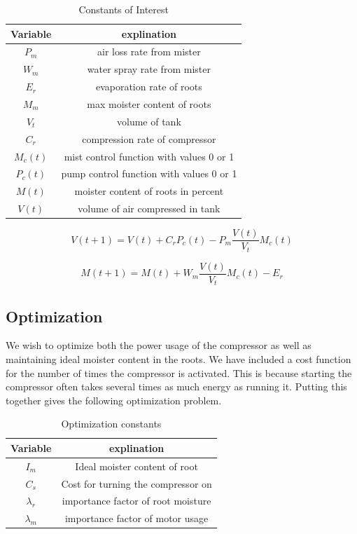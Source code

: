 \documentclass[a4paper,12pt]{article}
\begin{document}
\begin{table}[ht]
\caption{Constants of Interest}
\centering
\begin{tabular} {c c}
\hline\hline
 Variable & explination \\ [0.5ex]
\hline
$P_m$ & air loss rate from mister \\
$W_m$ & water spray rate from mister \\
$E_r$ & evaporation rate of roots \\ 
$M_m$ & max moister content of roots \\ 
$V_t$ & volume of tank \\
$C_r$ & compression rate of compressor \\
$M_c(t)$ & mist control function with values 0 or 1 \\
$P_c(t)$ & pump control function with values 0 or 1 \\
$M(t)$ & moister content of roots in percent \\
$V(t)$ & volume of air compressed in tank \\
\hline
\end{tabular}
\end{table}

\begin{equation}
		  V(t+1) = V(t) + C_r P_c(t) - P_m \frac{V(t)}{V_t} M_c(t)
\end{equation}

\begin{equation}
		  M(t+1) = M(t) + W_m \frac{V(t)}{V_t} M_c(t) - E_r
\end{equation}

\subsection{Optimization}

We wish to optimize both the power usage of the compressor as well as maintaining ideal moister content in the roots. We have included a cost function for the number of times the compressor is activated. This is because starting the compressor often takes several times as much energy as running it. Putting this together gives the following optimization problem.

\begin{table}[ht]
\caption{Optimization constants}
\centering
\begin{tabular} {c c}
\hline\hline
 Variable & explination \\ [0.5ex]
\hline
$I_m$ & Ideal moister content of root \\
$C_s$ & Cost for turning the compressor on \\
$\lambda_r$ & importance factor of root moisture \\
$\lambda_m$ & importance factor of motor usage \\ 
\hline
\end{tabular}
\end{table}
\end{document}
